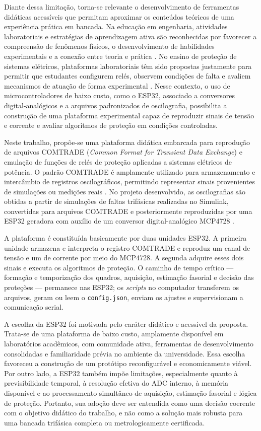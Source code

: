 Diante dessa limitação, torna-se relevante o desenvolvimento de ferramentas didáticas acessíveis que permitam aproximar os conteúdos teóricos de uma experiência prática em bancada. Na educação em engenharia, atividades laboratoriais e estratégias de aprendizagem ativa são reconhecidas por favorecer a compreensão de fenômenos físicos, o desenvolvimento de habilidades experimentais e a conexão entre teoria e prática \cite{prince2004active,feisel2005laboratory}. No ensino de proteção de sistemas elétricos, plataformas laboratoriais têm sido propostas justamente para permitir que estudantes configurem relés, observem condições de falta e avaliem mecanismos de atuação de forma experimental \cite{ferris2013protectionlab,radhi2020plc}. Nesse contexto, o uso de microcontroladores de baixo custo, como o ESP32, associado a conversores digital-analógicos e a arquivos padronizados de oscilografia, possibilita a construção de uma plataforma experimental capaz de reproduzir sinais de tensão e corrente e avaliar algoritmos de proteção em condições controladas.

Neste trabalho, propõe-se uma plataforma didática embarcada para reprodução de arquivos COMTRADE (\textit{Common Format for Transient Data Exchange}) e emulação de funções de relés de proteção aplicadas a sistemas elétricos de potência. O padrão COMTRADE é amplamente utilizado para armazenamento e intercâmbio de registros oscilográficos, permitindo representar sinais provenientes de simulações ou medições reais \cite{ieee_comtrade,iec_60255_24_2013}. No projeto desenvolvido, as oscilografias são obtidas a partir de simulações de faltas trifásicas realizadas no Simulink, convertidas para arquivos COMTRADE e posteriormente reproduzidas por uma ESP32 geradora com auxílio de um conversor digital-analógico MCP4728 \cite{espressif_esp32,microchip_mcp4728}.

A plataforma é constituída basicamente por duas unidades ESP32. A primeira unidade armazena e interpreta o registro COMTRADE e reproduz um canal de tensão e um de corrente por meio do MCP4728. A segunda adquire esses dois sinais e executa os algoritmos de proteção. O caminho de tempo crítico --- formação e temporização dos quadros, aquisição, estimação fasorial e decisão das proteções --- permanece nas ESP32; os \textit{scripts} no computador transferem os arquivos, geram ou leem o \texttt{config.json}, enviam os ajustes e supervisionam a comunicação serial.

A escolha da ESP32 foi motivada pelo caráter didático e acessível da proposta. Trata-se de uma plataforma de baixo custo, amplamente disponível em laboratórios acadêmicos, com comunidade ativa, ferramentas de desenvolvimento consolidadas e familiaridade prévia no ambiente da universidade. Essa escolha favoreceu a construção de um protótipo reconfigurável e economicamente viável. Por outro lado, a ESP32 também impõe limitações, especialmente quanto à previsibilidade temporal, à resolução efetiva do ADC interno, à memória disponível e ao processamento simultâneo de aquisição, estimação fasorial e lógica de proteção. Portanto, sua adoção deve ser entendida como uma decisão coerente com o objetivo didático do trabalho, e não como a solução mais robusta para uma bancada trifásica completa ou metrologicamente certificada.

